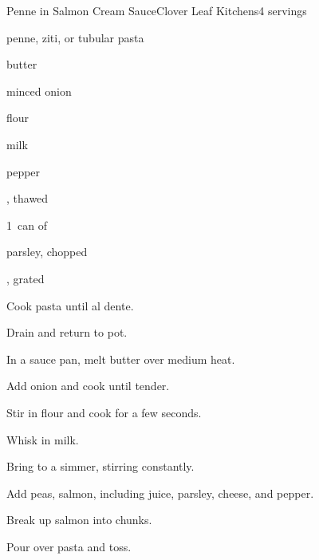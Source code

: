 \begin{recipe}{Penne in Salmon Cream Sauce}{Clover Leaf Kitchens}{4 servings}

\begin{ingredients}
\item {} penne, ziti, or tubular pasta
\item {} butter
\item {} minced onion
\item {} flour
\item \C{1\quarter} milk
\item pepper
\item {} , thawed
\item 1~can of 
\item \C{\quarter} parsley, chopped
\item \C{\quarter} , grated
\end{ingredients}

\begin{directions}
\item Cook pasta until al dente.
\item Drain and return to pot.
\item In a sauce pan, melt butter over medium heat.
\item Add onion and cook until tender.
\item Stir in flour and cook for a few seconds.
\item Whisk in milk.
\item Bring to a simmer, stirring constantly.
\item Add peas, salmon, including juice, parsley, cheese, and pepper.
\item Break up salmon into chunks.
\item Pour over pasta and toss.
\end{directions}

\end{recipe}
